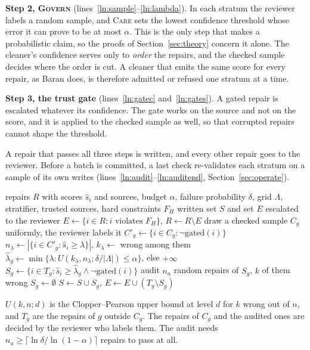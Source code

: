 \documentclass[sigconf, nonacm, balance=false]{acmart}
\theoremstyle{remark}
\begin{document}
\textbf{Step 2, \textsc{Govern}} (lines~\ref{ln:sample}--\ref{ln:lambda}). In each
stratum the reviewer labels a random sample, and \textsc{Care} sets the lowest
confidence threshold whose error it can prove to be at most $\alpha$. This is the only
step that makes a probabilistic claim, so the proofs of Section~\ref{sec:theory}
concern it alone. The cleaner's confidence serves only to \emph{order} the repairs, and
the checked sample decides where the order is cut. A cleaner that emits the same score
for every repair, as Baran does, is therefore admitted or refused one stratum at a
time.

\textbf{Step 3, the trust gate} (lines~\ref{ln:gatec} and~\ref{ln:gates}). A gated
repair is escalated whatever its confidence. The gate works on the source and not on
the score, and it is applied to the checked sample as well, so that corrupted repairs
cannot shape the threshold.

A repair that passes all three steps is written, and every other repair goes to the
reviewer. Before a batch is committed, a last check re-validates each stratum on a
sample of its own writes (lines~\ref{ln:audit}--\ref{ln:auditend},
Section~\ref{sec:operate}).

\begin{algorithm}[t]
\caption{\textsc{Care} on one batch of proposed repairs}
\label{alg:care}
\small
\begin{algorithmic}[1]
\Require repairs $R$ with scores $\hat s_i$ and sources, budget $\alpha$, failure
  probability $\delta$, grid $\Lambda$, stratifier, trusted sources, hard constraints $F_H$
\Ensure written set $S$ and set $E$ escalated to the reviewer
\State \label{ln:verify}$E\gets\{i\in R: i \text{ violates } F_H\}$,\; $R\gets R\setminus E$ 
  \State \label{ln:sample}draw a checked sample $C_g$ uniformly, the reviewer labels it
  \State \label{ln:gatec}$C'_g\gets\{i\in C_g:\neg\mathrm{gated}(i)\}$ 
  \For{$\lambda\in\Lambda$}
    \State $n_\lambda\gets|\{i\in C'_g:\hat s_i\ge\lambda\}|$,\; $k_\lambda\gets$ wrong among them
  \EndFor
  \State \label{ln:lambda}$\hat\lambda_g\gets\min\{\lambda: U(k_\lambda,n_\lambda;\delta/|\Lambda|)\le\alpha\}$, else $+\infty$
  \State \label{ln:gates}$S_g\gets\{i\in T_g:\hat s_i\ge\hat\lambda_g\wedge\neg\mathrm{gated}(i)\}$
  \State \label{ln:audit}audit $n_a$ random repairs of $S_g$, $k$ of them wrong
   $S_g\gets\emptyset$ 
  \EndIf\label{ln:auditend}
  \State $S\gets S\cup S_g$,\; $E\gets E\cup(T_g\setminus S_g)$
\EndFor
\end{algorithmic}
{\footnotesize $U(k,n;d)$ is the Clopper--Pearson upper bound at level $d$ for $k$ wrong
out of $n$, and $T_g$ are the repairs of $g$ outside $C_g$. The repairs of $C_g$ and the
audited ones are decided by the reviewer who labels them. The audit needs
$n_a\ge\lceil\ln\delta/\ln(1-\alpha)\rceil$ repairs to pass at all.}
\end{algorithm}
\end{document}
